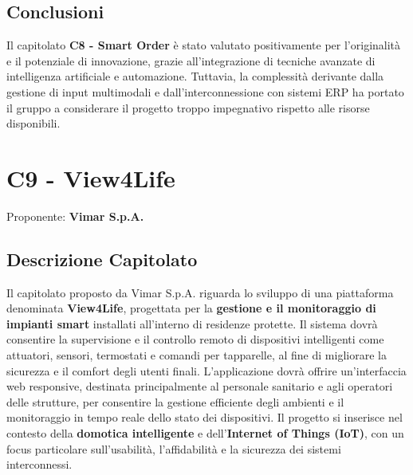 \documentclass[a4paper,12pt]{article}
\begin{document}
{{{    \subsection{Conclusioni}
        Il capitolato \textbf{C8 - Smart Order} è stato valutato positivamente per l’originalità e il potenziale di innovazione, grazie all’integrazione di tecniche avanzate di intelligenza artificiale e automazione.
        Tuttavia, la complessità derivante dalla gestione di input multimodali e dall’interconnessione con sistemi ERP ha portato il gruppo a considerare il progetto troppo impegnativo rispetto alle risorse disponibili.
    

\newpage

\section{C9 - View4Life}
    Proponente: \textbf{Vimar S.p.A.}

    \subsection{Descrizione Capitolato}
        Il capitolato proposto da Vimar S.p.A. riguarda lo sviluppo di una piattaforma denominata \textbf{View4Life}, progettata per la \textbf{gestione e il monitoraggio di impianti smart} installati all’interno di residenze protette.
        Il sistema dovrà consentire la supervisione e il controllo remoto di dispositivi intelligenti come attuatori, sensori, termostati e comandi per tapparelle, al fine di migliorare la sicurezza e il comfort degli utenti finali.
        L’applicazione dovrà offrire un’interfaccia web responsive, destinata principalmente al personale sanitario e agli operatori delle strutture, per consentire la gestione efficiente degli ambienti e il monitoraggio in tempo reale dello stato dei dispositivi.
        Il progetto si inserisce nel contesto della \textbf{domotica intelligente} e dell’\textbf{Internet of Things (IoT)}, con un focus particolare sull’usabilità, l’affidabilità e la sicurezza dei sistemi interconnessi.
    

}}}
\end{document}
